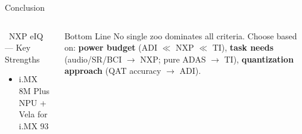 \documentclass[aspectratio=169]{beamer}
\begin{document}
\begin{frame}{Conclusion}
\begin{columns}
\begin{block}{\textcolor{NXPOrange}{\faCheckCircle}\ NXP eIQ --- Key Strengths}
\begin{itemize}
  \item i.MX 8M Plus NPU + Vela for i.MX 93
\end{itemize}
\end{block}
\vspace{0.3cm}
\begin{alertblock}{Bottom Line}
\footnotesize
No single zoo dominates all criteria. Choose based on:
\textbf{power budget} (ADI $\ll$ NXP $\ll$ TI),
\textbf{task needs} (audio/SR/BCI $\rightarrow$ NXP; pure ADAS $\rightarrow$ TI),
\textbf{quantization approach} (QAT accuracy $\rightarrow$ ADI).
\end{alertblock}
\end{columns}
\end{frame}
\end{document}
